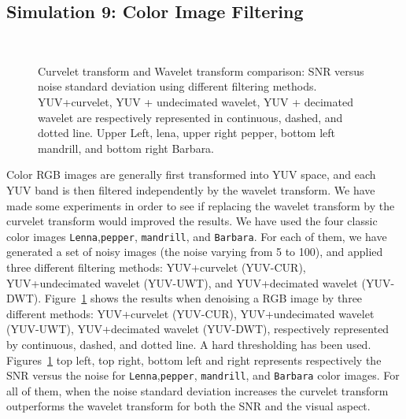 \documentclass[11pt,a4paper]{article}
\begin{document}
\subsection{Simulation 9: Color Image Filtering}

\begin{figure}[htb]
\centerline{
\vbox{
\hbox{ 
}
\hbox{ 
}
}}
\caption{Curvelet transform and Wavelet transform comparison: SNR versus noise standard deviation using different filtering methods.  
YUV+curvelet, YUV + undecimated wavelet, YUV + decimated wavelet
are respectively represented in continuous, dashed, and dotted line. 
Upper Left, lena, upper right pepper, bottom left mandrill, and bottom
right Barbara. }
\label{fig_exp_rgb_curv}
\end{figure}

Color RGB images are generally first transformed into YUV space,
and each YUV band is then filtered independently by the wavelet transform.
We have made some experiments in order to see if replacing the wavelet
transform by the curvelet transform would improved the results. We have used
the four classic color images
 {\tt Lenna},{\tt  pepper}, {\tt mandrill}, and {\tt Barbara}.
For each of them, we have generated a set of noisy images (the noise 
varying from 5 to 100), and applied three different filtering methods:
YUV+curvelet (YUV-CUR), YUV+undecimated wavelet (YUV-UWT), and
YUV+decimated wavelet (YUV-DWT).
Figure~\ref{fig_exp_rgb_curv} shows the results
when denoising a RGB image by three different methods: 
YUV+curvelet (YUV-CUR), YUV+undecimated wavelet (YUV-UWT), 
YUV+decimated wavelet (YUV-DWT), respectively represented by 
continuous, dashed, and dotted line. A hard thresholding has been used.
Figures~\ref{fig_exp_rgb_curv} top left, top right, bottom left and right
 represents respectively the SNR versus the noise for  
{\tt Lenna},{\tt  pepper}, {\tt mandrill}, and {\tt Barbara} color images.
For all of them, when the noise standard deviation increases 
the curvelet transform outperforms the wavelet transform for both the SNR and
the visual aspect.

\end{document}

